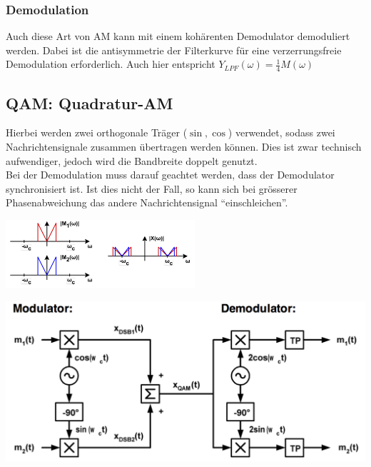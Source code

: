 \subsubsection{Demodulation}
	Auch diese Art von AM kann mit einem kohärenten Demodulator demoduliert werden. Dabei ist die antisymmetrie der Filterkurve für eine verzerrungsfreie Demodulation erforderlich.
	Auch hier entspricht $Y_{LPF}(\omega) = \frac{1}{4}M(\omega)$


\subsection{QAM: Quadratur-AM}
	\begin{minipage}{12cm}
		Hierbei werden zwei orthogonale Träger ($\sin, \cos$) verwendet, sodass zwei Nachrichtensignale zusammen übertragen werden können. Dies ist zwar technisch aufwendiger, jedoch wird die Bandbreite doppelt genutzt. \\
		Bei der Demodulation muss darauf geachtet werden, dass der Demodulator synchronisiert ist. Ist dies nicht der Fall, so kann sich bei grösserer Phasenabweichung das andere Nachrichtensignal ``einschleichen''.
	\end{minipage}
	\begin{minipage}{7cm}
		\includegraphics[width=7cm]{bilder/am_qam_spektrum.png}
	\end{minipage}
	\begin{center}
    	\includegraphics[width=14cm]{bilder/am_qam_modulatorDemodulator.png}
	\end{center}
